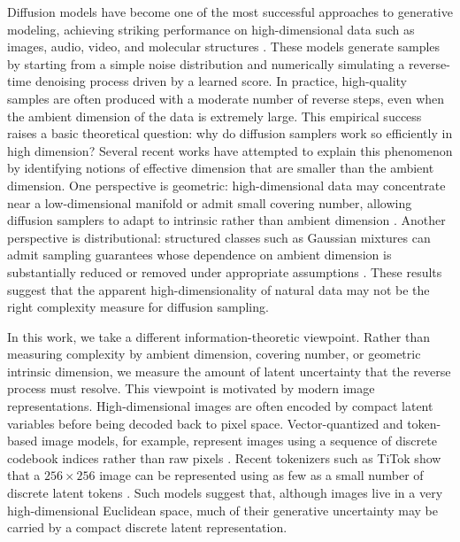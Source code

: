 \documentclass[11pt]{article}
\def\times{×}%
\begin{document}
Diffusion models have become one of the most successful approaches to generative modeling, achieving striking performance on high-dimensional data such as images, audio, video, and molecular structures \cite{sohl2015deep,song2019generative,song2021scorebased,dhariwal2021diffusion,rombach2022high}. These models generate samples by starting from a simple noise distribution and numerically simulating a reverse-time denoising process driven by a learned score. In practice, high-quality samples are often produced with a moderate number of reverse steps, even when the ambient dimension of the data is extremely large. This empirical success raises a basic theoretical question: why do diffusion samplers work so efficiently in high dimension?
Several recent works have attempted to explain this phenomenon by identifying
notions of effective dimension that are smaller than the ambient dimension.
One perspective is geometric: high-dimensional data may concentrate near a
low-dimensional manifold or admit small covering number, allowing diffusion
samplers to adapt to intrinsic rather than ambient dimension
\cite{liang2025low,pmlr-v291-potaptchik25a,huang2026denoising}. Another
perspective is distributional: structured classes such as Gaussian mixtures
can admit sampling guarantees whose dependence on ambient dimension is
substantially reduced or removed under appropriate assumptions
\cite{li2025dimension}. These results suggest that the apparent
high-dimensionality of natural data may not be the right complexity measure
for diffusion sampling.

In this work, we take a different information-theoretic viewpoint. Rather
than measuring complexity by ambient dimension, covering number, or geometric
intrinsic dimension, we measure the amount of latent uncertainty that the
reverse process must resolve. This viewpoint is motivated by modern image
representations. High-dimensional images are often encoded by compact latent
variables before being decoded back to pixel space. Vector-quantized and
token-based image models, for example, represent images using a sequence of
discrete codebook indices rather than raw pixels
\cite{van2017neural,esser2021taming,yu2024image}. Recent tokenizers such as
TiTok show that a $256\times256$ image can be represented using as few as a
small number of discrete latent tokens \cite{yu2024image}. Such models suggest
that, although images live in a very high-dimensional Euclidean space, much of
their generative uncertainty may be carried by a compact discrete latent
representation.
\end{document}
